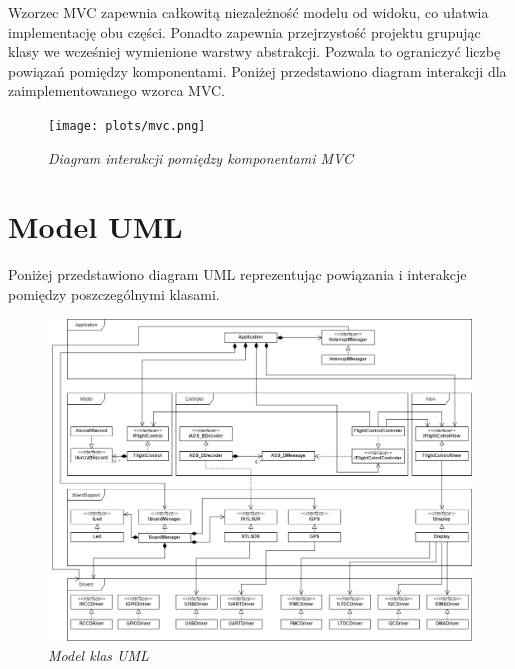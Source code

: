 \documentclass[eng,printmode]{mgr}
\begin{document}
Wzorzec MVC zapewnia całkowitą niezależność modelu od widoku, co ułatwia implementację obu części. Ponadto zapewnia przejrzystość projektu grupując klasy we wcześniej wymienione warstwy abstrakcji. Pozwala to ograniczyć liczbę powiązań pomiędzy komponentami. Poniżej przedstawiono diagram interakcji dla zaimplementowanego wzorca MVC.


\begin{center}\centering
\vspace*{\fill}
\begin{figure}[!h]
    \centering
    \texttt{[image: plots/mvc.png]}
    \caption{\textit{Diagram interakcji pomiędzy komponentami MVC}}
\end{figure}
\vfill
\end{center}

\section{Model UML}

Poniżej przedstawiono diagram UML reprezentując powiązania i interakcje pomiędzy poszczególnymi klasami.
\vskip 0.55cm
\begin{figure}[!h]
    \centering
    \includegraphics[height=\textwidth, angle=90]{plots/uml.png}
    \caption{\textit{Model klas UML}}
\end{figure}
\end{document}

